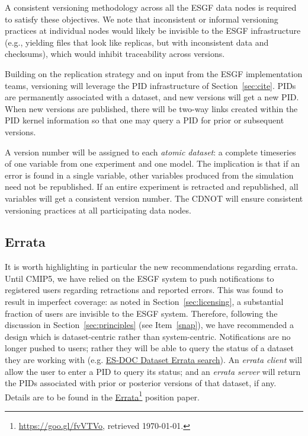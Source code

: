 \documentclass[gmd,manuscript]{copernicus}
\newcommand{\urlref}[2] {\href{#1}{#2}\footnote{\url{#1}, retrieved \today.}}
\begin{document}
A consistent versioning methodology across all the ESGF data nodes is
required to satisfy these objectives. We note that inconsistent or
informal versioning practices at individual nodes would likely be
invisible to the ESGF infrastructure (e.g., yielding files that look
like replicas, but with inconsistent data and checksums), which would
inhibit traceability across versions.

Building on the replication strategy and on input from
the ESGF implementation teams, versioning will leverage the PID
infrastructure of Section~\ref{sec:cite}. PIDs are permanently
associated with a dataset, and new versions will get a new PID. When
new versions are published, there will be two-way links created within
the PID kernel information so that one may query a PID for prior or
subsequent versions.

A version number will be assigned to each \emph{atomic dataset}: a complete
timeseries of one variable from one experiment and one model. The
implication is that if an error is found in a single variable, other variables
produced from the simulation need not be republished. If an entire experiment is
retracted and republished, all variables will get a consistent version
number. The CDNOT will ensure consistent versioning practices at all
participating data nodes.

\subsection{Errata}
\label{sec:errata}

It is worth highlighting in particular the new recommendations
regarding errata. Until CMIP5, we have relied on the ESGF system to
push notifications to registered users regarding retractions and
reported errors. This was found to result in imperfect coverage: as
noted in Section~\ref{sec:licensing}, a substantial fraction of users
are invisible to the ESGF system. Therefore, following the discussion
in Section~\ref{sec:principles} (see Item~\ref{snap}), we have
recommended a design which is dataset-centric rather than
system-centric. Notifications are no longer pushed to users; rather
they will be able to query the status of a dataset they are working
with (e.g.
\hyperlink{https://errata.es-doc.org/static/index.html}{ES-DOC Dataset Errata search}).
An \emph{errata client} will allow the user to enter a PID to
query its status; and an \emph{errata server} will return the PIDs
associated with prior or posterior versions of that dataset, if any.
Details are to be found in the \urlref{https://goo.gl/fvVTVo}{Errata}
position paper.
\end{document}
